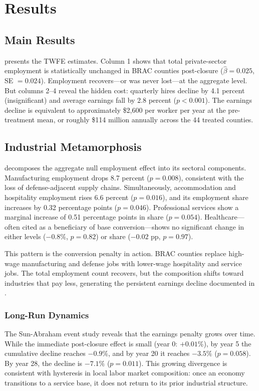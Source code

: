 \documentclass[12pt]{article}
\begin{document}
\section{Results}

\subsection{Main Results}



 presents the TWFE estimates. Column 1 shows that total private-sector employment is statistically unchanged in BRAC counties post-closure ($\hat{\beta} = 0.025$, SE $= 0.024$). Employment recovers---or was never lost---at the aggregate level. But columns 2--4 reveal the hidden cost: quarterly hires decline by 4.1 percent (insignificant) and average earnings fall by 2.8 percent ($p < 0.001$). The earnings decline is equivalent to approximately \$2,600 per worker per year at the pre-treatment mean, or roughly \$114 million annually across the 44 treated counties.

\subsection{Industrial Metamorphosis}



 decomposes the aggregate null employment effect into its sectoral components. Manufacturing employment drops 8.7 percent ($p = 0.008$), consistent with the loss of defense-adjacent supply chains. Simultaneously, accommodation and hospitality employment rises 6.6 percent ($p = 0.016$), and its employment share increases by 0.32 percentage points ($p = 0.046$). Professional services show a marginal increase of 0.51 percentage points in share ($p = 0.054$). Healthcare---often cited as a beneficiary of base conversion---shows no significant change in either levels ($-0.8\%$, $p = 0.82$) or share ($-0.02$ pp, $p = 0.97$).

This pattern is the conversion penalty in action. BRAC counties replace high-wage manufacturing and defense jobs with lower-wage hospitality and service jobs. The total employment count recovers, but the composition shifts toward industries that pay less, generating the persistent earnings decline documented in .

\subsubsection*{Long-Run Dynamics} The Sun-Abraham event study reveals that the earnings penalty grows over time. While the immediate post-closure effect is small (year 0: $+0.01\%$), by year 5 the cumulative decline reaches $-0.9\%$, and by year 20 it reaches $-3.5\%$ ($p = 0.058$). By year 28, the decline is $-7.1\%$ ($p = 0.011$). This growing divergence is consistent with hysteresis in local labor market composition: once an economy transitions to a service base, it does not return to its prior industrial structure.
\end{document}

